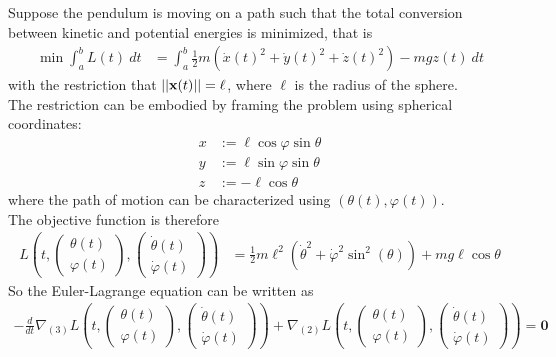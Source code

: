 \documentclass[11pt]{article}
\begin{document}
	\begin{example}
		Suppose the pendulum is moving on a path such that the total conversion between kinetic and potential energies is minimized, that is
		\begin{align}
			\min \int_a^b L(t)\ dt &= \int_a^b \frac{1}{2} m (\dot{x}(t)^2 + \dot{y}(t)^2 + \dot{z}(t)^2) - m g z(t)\ dt
		\end{align}
		with the restriction that $\vert \vert {\textbf{x}(t)} \vert \vert = \ell$, where $\ell$ is the radius of the sphere. \\
		The restriction can be embodied by framing the problem using spherical coordinates:
		\begin{align}
			x &:= \ell \cos \varphi \sin \theta \\
			y &:= \ell \sin \varphi \sin \theta \\
			z &:= - \ell \cos \theta
		\end{align}
		where the path of motion can be characterized using $(\theta(t), \varphi(t))$. \\
		The objective function is therefore
		\begin{align}
			L\left( t, \begin{pmatrix} \theta(t) \\ \varphi(t)	\end{pmatrix}, \begin{pmatrix} \dot{\theta}(t) \\ \dot{\varphi}(t) \end{pmatrix} \right) &= \frac{1}{2} m \ell^2 (\dot{\theta}^2 + \dot{\varphi}^2 \sin^2 (\theta)) + mg\ell \cos \theta
		\end{align}
		So the Euler-Lagrange equation can be written as
		\begin{align}
			- \frac{d}{dt} \nabla_{(3)} L \left( t, \begin{pmatrix} \theta(t) \\ \varphi(t)	\end{pmatrix}, \begin{pmatrix} \dot{\theta}(t) \\ \dot{\varphi}(t) \end{pmatrix} \right)
			+ \nabla_{(2)} L\left( t, \begin{pmatrix} \theta(t) \\ \varphi(t)	\end{pmatrix}, \begin{pmatrix} \dot{\theta}(t) \\ \dot{\varphi}(t) \end{pmatrix} \right)
			= \textbf{0}
		\end{align}
	\end{example}
\end{document}
